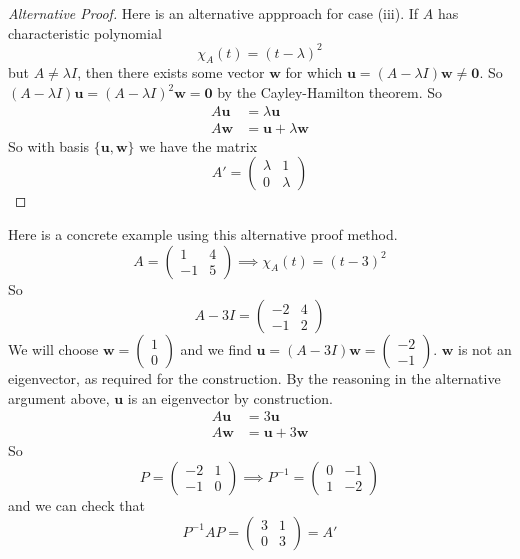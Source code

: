 \documentclass{article}
\begin{document}
\begin{proof}[Alternative Proof]
	Here is an alternative appproach for case (iii). If $A$ has characteristic polynomial
	\[ \chi_A(t) = (t - \lambda)^2 \]
	but $A \neq \lambda I$, then there exists some vector $\bm w$ for which $\bm u = (A - \lambda I)\bm w \neq \bm 0$. So $(A - \lambda I)\bm u = (A - \lambda I)^2 \bm w  = \bm 0$ by the Cayley-Hamilton theorem. So
	\begin{align*}
		A\bm u & = \lambda \bm u         \\
		A\bm w & = \bm u + \lambda \bm w
	\end{align*}
	So with basis $\{ \bm u, \bm w \}$ we have the matrix
	\[ A' = \begin{pmatrix}
			\lambda & 1       \\
			0       & \lambda
		\end{pmatrix} \]
\end{proof}
Here is a concrete example using this alternative proof method.
\[ A = \begin{pmatrix}
		1 & 4 \\ -1 & 5
	\end{pmatrix} \implies \chi_A(t) = (t - 3)^2 \]
So
\[ A - 3I = \begin{pmatrix}
		-2 & 4 \\ -1 & 2
	\end{pmatrix} \]
We will choose $\bm w = \begin{pmatrix}
		1 \\ 0
	\end{pmatrix}$ and we find $\bm u = (A - 3I)\bm w = \begin{pmatrix}
		-2 \\ -1
	\end{pmatrix}$. $\bm w$ is not an eigenvector, as required for the construction. By the reasoning in the alternative argument above, $\bm u$ is an eigenvector by construction.
\begin{align*}
	A\bm u & = 3\bm u         \\
	A\bm w & = \bm u + 3\bm w
\end{align*}
So
\[ P = \begin{pmatrix}
		-2 & 1 \\ -1 & 0
	\end{pmatrix} \implies P^{-1} = \begin{pmatrix}
		0 & -1 \\ 1 & -2
	\end{pmatrix} \]
and we can check that
\[ P^{-1}AP = \begin{pmatrix}
		3 & 1 \\ 0 & 3
	\end{pmatrix} = A' \]
\end{document}
